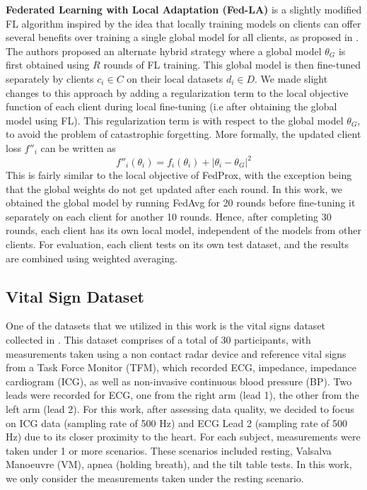 \textbf{Federated Learning with Local Adaptation (Fed-LA)} is a slightly modified FL algorithm inspired by the idea that locally training models on clients can offer several benefits over training a single global model for all clients, as proposed in \cite{yu2022salvagingfederatedlearninglocal}.
The authors proposed an alternate hybrid strategy where a global model \(\theta_G\) is first obtained using \(R\) rounds of FL training.
This global model is then fine-tuned separately by clients \(c_i \in C\) on their local datasets \(d_i \in D\).
We made slight changes to this approach by adding a regularization term to the local objective function of each client during local fine-tuning (i.e after obtaining the global model using FL). 
This regularization term is with respect to the global model \(\theta_G\), to avoid the problem of catastrophic forgetting.
More formally, the updated client loss \(f''_i\) can be written as
\[ f''_i(\theta_i) = f_i(\theta_i) + |\theta_i - \theta_G|^2  \]
This is fairly similar to the local objective of FedProx, with the exception being that the global weights do not get updated after each round.
In this work, we obtained the global model by running FedAvg for 20 rounds before fine-tuning it separately on each client for another 10 rounds.
Hence, after completing 30 rounds, each client has its own local model, independent of the models from other clients.
For evaluation, each client tests on its own test dataset, and the results are combined using weighted averaging.


\subsection{Vital Sign Dataset}
One of the datasets that we utilized in this work is the vital signs dataset collected in \cite{Schellenberger2020-lb}. 
This dataset comprises of a total of 30 participants, with measurements taken using a non contact radar device and reference vital signs from a Task Force Monitor (TFM), which recorded ECG, impedance, impedance cardiogram (ICG), as well as non-invasive continuous blood pressure (BP). Two leads were recorded for ECG, one from the right arm (lead 1), the other from the left arm (lead 2).  
For this work, after assessing data quality, we decided to focus on ICG data (sampling rate of 500 Hz) and ECG Lead 2 (sampling rate of 500 Hz) due to its closer proximity to the heart. 
For each subject, measurements were taken under 1 or more scenarios. 
These scenarios included resting, Valsalva Manoeuvre (VM), apnea (holding breath), and the tilt table tests. 
In this work, we only consider the measurements taken under the resting scenario.

